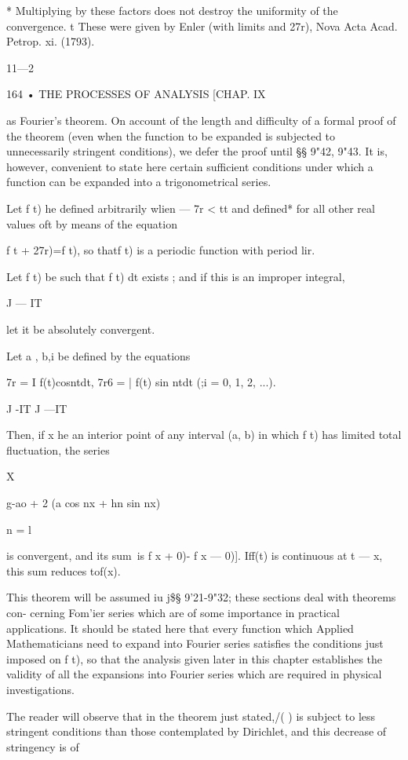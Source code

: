 * Multiplying by these factors does not destroy the uniformity of the
convergence. t These were given by Enler (with limits and 27r), Nova
Acta Acad. Petrop. xi. (1793).

11—2



164 • THE PROCESSES OF ANALYSIS [CHAP. IX

as Fourier's theorem. On account of the length and difficulty of a
formal proof of the theorem (even when the function to be expanded is
subjected to unnecessarily stringent conditions), we defer the proof
until §§ 9"42, 9"43. It is, however, convenient to state here certain
sufficient conditions under which a function can be expanded into a
trigonometrical series.

Let f t) he defined arbitrarily wlien — 7r < tt and defined* for all
other real values oft by means of the equation

f t + 27r)=f t), so thatf t) is a periodic function with period lir.



Let f t) be such that f t) dt exists ; and if this is an improper
integral,

J — IT

let it be absolutely convergent.

Let a , b,i be defined by the equations

7r = I f(t)cosntdt, 7r6 = | f(t) sin ntdt (;i = 0, 1, 2, ...).

J -IT J —IT

Then, if x he an interior point of any interval (a, b) in which f t)
has limited total fluctuation, the series

X

 g-ao + 2 (a cos nx + hn sin nx)

n = l

is convergent, and its sum\ is f x + 0)- f x — 0)]. Iff(t) is
continuous at t — x, this sum reduces tof(x).

This theorem will be assumed iu j\$§ 9'21-9"32; these sections deal
with theorems con- cerning Fom'ier series which are of some importance
in practical applications. It should be stated here that every
function which Applied Mathematicians need to expand into Fourier
series satisfies the conditions just imposed on f t), so that the
analysis given later in this chapter establishes the validity of all
the expansions into Fourier series which are required in physical
investigations.

The reader will observe that in the theorem just stated,/( ) is
subject to less stringent conditions than those contemplated by
Dirichlet, and this decrease of stringency is of

